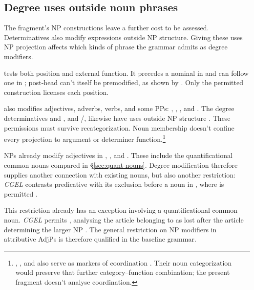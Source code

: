 \documentclass[12pt]{article}
\begin{document}
\subsection{Degree uses outside noun phrases}\label{sec:enough}

The fragment's NP constructions leave a further cost to be assessed. Determinatives also modify expressions outside NP structure. Giving these uses NP projection affects which kinds of phrase the grammar admits as degree modifiers.

 tests both position and external function. It precedes a nominal in  and can follow one in ; post-head  can't itself be premodified, as shown by  \citep[396--397, 445]{huddleston2002}. Only the permitted construction licenses each position.

 also modifies adjectives, adverbs, verbs, and some PPs: , , , and  \citep[396--397]{huddleston2002}. The degree determinatives  and , and /, likewise have uses outside NP structure \citep[390, 395--397]{huddleston2002}. These permissions must survive recategorization. Noun membership doesn't confine every projection to argument or determiner function.\footnote{, , and  also serve as markers of coordination \citep[1305, 1308]{huddleston2002}. Their noun categorization would preserve that further category--function combination; the present fragment doesn't analyse coordination.}

NPs already modify adjectives in , , and  \citep[549--550]{huddleston2002}. These include the quantificational common nouns compared in §\ref{sec:quant-nouns}. Degree modification therefore supplies another connection with existing nouns, but also another restriction: \textit{CGEL} contrasts predicative  with its exclusion before a noun in , where  is permitted \citep[551--552]{huddleston2002}.

This restriction already has an exception involving a quantificational common noun. \textit{CGEL} permits , analysing the article belonging to  as lost after the article determining the larger NP \citep[p.~552, n.~8]{huddleston2002}. The general restriction on NP modifiers in attributive AdjPs is therefore qualified in the baseline grammar.
\end{document}
